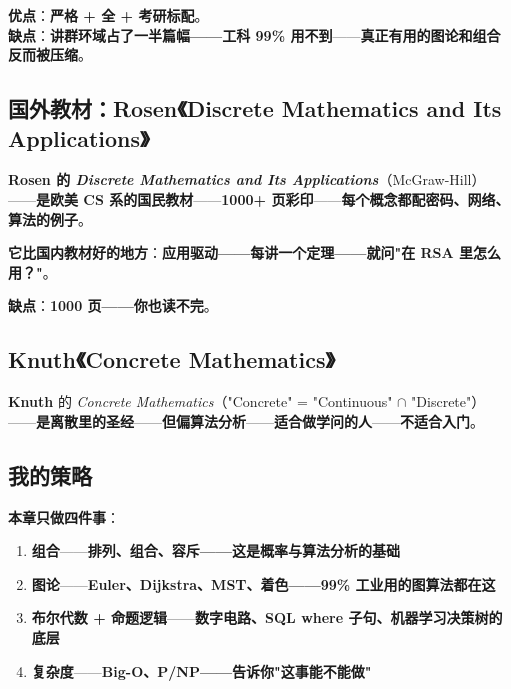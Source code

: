 \textbf{优点}：\textbf{严格 + 全 + 考研标配}。\\
\textbf{缺点}：\textbf{讲群环域占了一半篇幅——\textbf{工科 99\% 用不到}}——\textbf{真正有用的图论和组合反而被压缩}。

\subsection{国外教材：Rosen《Discrete Mathematics and Its Applications》}

\textbf{Rosen 的 \emph{Discrete Mathematics and Its Applications}}（McGraw-Hill）——\textbf{是欧美 CS 系的国民教材}——\textbf{1000+ 页彩印}——\textbf{每个概念都配\textbf{密码、网络、算法}的例子}。

\textbf{它比国内教材好的地方}：\textbf{应用驱动——每讲一个定理——就问"在 RSA 里怎么用？"}。

\textbf{缺点}：\textbf{1000 页——你也读不完}。

\subsection{Knuth《Concrete Mathematics》}

\textbf{Knuth} 的 \emph{Concrete Mathematics}（"Concrete" = "Continuous" $\cap$ "Discrete"）——\textbf{是离散里的\textbf{圣经}}——\textbf{但偏算法分析}——\textbf{适合做学问的人}——\textbf{不适合入门}。

\subsection{我的策略}

\textbf{本章只做四件事}：

\begin{enumerate}
\item \textbf{组合}——\textbf{排列、组合、容斥——这是概率与算法分析的基础}
\item \textbf{图论}——\textbf{Euler、Dijkstra、MST、着色——\textbf{99\% 工业用的图算法都在这}}
\item \textbf{布尔代数 + 命题逻辑}——\textbf{数字电路、SQL where 子句、机器学习决策树的底层}
\item \textbf{复杂度}——\textbf{Big-O、P/NP——告诉你"这事能不能做"}
\end{enumerate}

